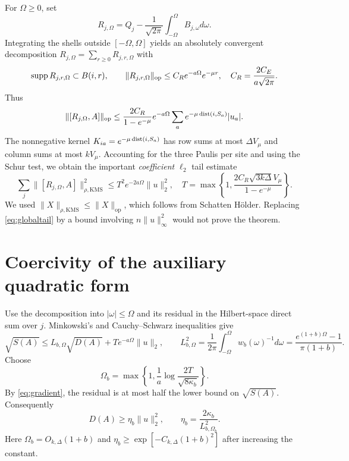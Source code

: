 \documentclass[11pt]{article}
\theoremstyle{remark}\newtheorem{remark}[theorem]{Remark}
\newcommand{\kn}[1]{\|#1\|_{\rho,\mathrm{KMS}}}
\newcommand{\op}[1]{\|#1\|_{\mathrm{op}}}
\begin{document}
For $\Omega\ge0$, set
\[
 R_{j,\Omega}=Q_j-\frac1{\sqrt{2\pi}}\int_{-\Omega}^\Omega B_{j,\omega}d\omega.
\]
Integrating the shells outside $[-\Omega,\Omega]$ yields an absolutely convergent decomposition $R_{j,\Omega}=\sum_{r\ge0}R_{j,r,\Omega}$ with
\begin{equation}\label{eq:Rtail}
 \supp R_{j,r,\Omega}\subset B(i,r),\qquad
 \op{R_{j,r,\Omega}}\le C_R e^{-a\Omega}e^{-\mu r},\quad
 C_R=\frac{2C_E}{a\sqrt{2\pi}}.
\end{equation}
Thus
\[
 \op{[R_{j,\Omega},A]}\le
 \frac{2C_R}{1-e^{-\mu}}e^{-a\Omega}
 \sum_a e^{-\mu\dist(i,S_a)}|u_a|.
\]
The nonnegative kernel $K_{ia}=e^{-\mu\operatorname{dist}(i,S_a)}$ has row sums at most $\Delta V_\mu$ and column sums at most $kV_\mu$. Accounting for the three Paulis per site and using the Schur test, we obtain the important \emph{coefficient $\ell_2$} tail estimate
\begin{equation}\label{eq:globaltail}
 \sum_j\kn{[R_{j,\Omega},A]}^2
 \le T^2e^{-2a\Omega}\|u\|_2^2,
 \quad T=\max\left\{1,\frac{2C_R\sqrt{3k\Delta}V_\mu}{1-e^{-\mu}}\right\}.
\end{equation}
We used $\kn X\le\op X$, which follows from Schatten H\"older. Replacing \eqref{eq:globaltail} by a bound involving $n\|u\|_\infty^2$ would not prove the theorem.

\section{Coercivity of the auxiliary quadratic form}
Use the decomposition into $|\omega|\le\Omega$ and its residual in the Hilbert-space direct sum over $j$. Minkowski's and Cauchy--Schwarz inequalities give
\begin{equation}\label{eq:split}
 \sqrt{S(A)}\le L_{b,\Omega}\sqrt{D(A)}+Te^{-a\Omega}\|u\|_2,
 \qquad L_{b,\Omega}^2=\frac1{2\pi}\int_{-\Omega}^{\Omega}w_b(\omega)^{-1}d\omega
 =\frac{e^{(1+b)\Omega}-1}{\pi(1+b)}.
\end{equation}
Choose
\begin{equation}\label{eq:cutoff}
 \Omega_b=\max\left\{1,\frac1a\log\frac{2T}{\sqrt{8\kappa_b}}\right\}.
\end{equation}
By \eqref{eq:gradient}, the residual is at most half the lower bound on $\sqrt{S(A)}$. Consequently
\begin{equation}\label{eq:coercive}
 D(A)\ge\eta_b\|u\|_2^2,\qquad
 \eta_b=\frac{2\kappa_b}{L_{b,\Omega_b}^2}.
\end{equation}
Here $\Omega_b=O_{k,\Delta}(1+b)$ and $\eta_b\ge\exp[-C_{k,\Delta}(1+b)^2]$ after increasing the constant.
\end{document}
